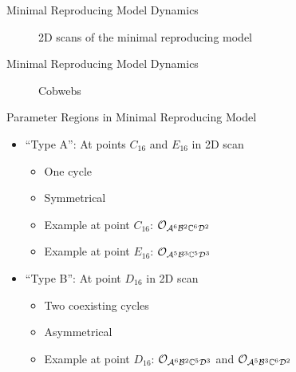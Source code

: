 \begin{frame}{Minimal Reproducing Model Dynamics}
    \vspace{-1.0em}
    \begin{figure}
        \centering
        \caption*{2D scans of the minimal reproducing model}
    \end{figure}
\end{frame}

\begin{frame}{Minimal Reproducing Model Dynamics}
    \begin{figure}
        \centering
        \caption*{Cobwebs}
    \end{figure}
\end{frame}

\begin{frame}{Parameter Regions in Minimal Reproducing Model}
    \begin{itemize}
        \item ``Type A'': At points $C_{16}$ and $E_{16}$ in 2D scan
              \begin{itemize}
                  \item One cycle
                  \item Symmetrical
                  \item Example at point $C_{16}$: $\mathcal{O}_{\mathcal{A}^6\mathcal{B}^2\mathbb{C}^6\mathcal{D}^2}$
                  \item Example at point $E_{16}$: $\mathcal{O}_{\mathcal{A}^5\mathcal{B}^3\mathbb{C}^5\mathcal{D}^3}$ \vspace*{1em}
              \end{itemize}
        \item ``Type B'': At point $D_{16}$ in 2D scan
              \begin{itemize}
                  \item Two coexisting cycles
                  \item Asymmetrical
                  \item Example at point $D_{16}$: $\mathcal{O}_{\mathcal{A}^6\mathcal{B}^2\mathbb{C}^5\mathcal{D}^3}$ and $\mathcal{O}_{\mathcal{A}^5\mathcal{B}^3\mathbb{C}^6\mathcal{D}^2}$
              \end{itemize}
    \end{itemize}
\end{frame}

